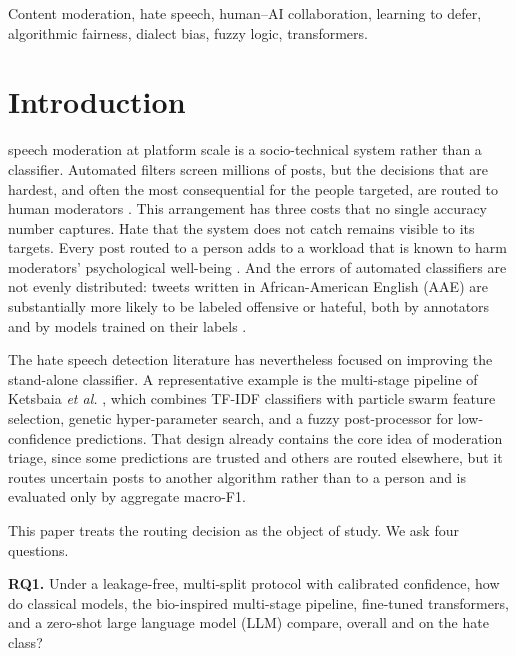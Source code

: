 \documentclass[lettersize,journal]{IEEEtran}
\begin{document}
\begin{IEEEkeywords}
Content moderation, hate speech, human--AI collaboration, learning to defer, algorithmic fairness, dialect bias, fuzzy logic, transformers.
\end{IEEEkeywords}

\section{Introduction}
 speech moderation at platform scale is a socio-technical system rather than a classifier. Automated filters screen millions of posts, but the decisions that are hardest, and often the most consequential for the people targeted, are routed to human moderators \cite{gillespie2018custodians,gorwa2020algorithmic}. This arrangement has three costs that no single accuracy number captures. Hate that the system does not catch remains visible to its targets. Every post routed to a person adds to a workload that is known to harm moderators' psychological well-being \cite{roberts2019behind,steiger2021psychological}. And the errors of automated classifiers are not evenly distributed: tweets written in African-American English (AAE) are substantially more likely to be labeled offensive or hateful, both by annotators and by models trained on their labels \cite{sap2019risk,davidson2019racial}.

The hate speech detection literature has nevertheless focused on improving the stand-alone classifier. A representative example is the multi-stage pipeline of Ketsbaia \textit{et al.} \cite{ketsbaia2023multistage}, which combines TF-IDF classifiers with particle swarm feature selection, genetic hyper-parameter search, and a fuzzy post-processor for low-confidence predictions. That design already contains the core idea of moderation triage, since some predictions are trusted and others are routed elsewhere, but it routes uncertain posts to another algorithm rather than to a person and is evaluated only by aggregate macro-F1.

This paper treats the routing decision as the object of study. We ask four questions.

\textbf{RQ1.} Under a leakage-free, multi-split protocol with calibrated confidence, how do classical models, the bio-inspired multi-stage pipeline, fine-tuned transformers, and a zero-shot large language model (LLM) compare, overall and on the hate class?
\end{document}
